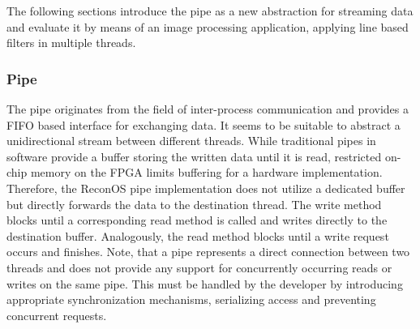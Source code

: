 The following sections introduce the pipe as a new abstraction for streaming
data and evaluate it by means of an image processing application, applying
line based filters in multiple threads.

\subsubsection{Pipe}
The pipe originates from the field of inter-process communication and provides
a \ac{FIFO} based interface for exchanging data. It seems to be suitable to
abstract a unidirectional stream between different threads. While traditional
pipes in software provide a buffer storing the written data until it is read,
restricted on-chip memory on the \ac{FPGA} limits buffering for a hardware
implementation. Therefore, the ReconOS pipe implementation does not utilize a
dedicated buffer but directly forwards the data to the destination thread. The
write method blocks until a corresponding read method is called and writes
directly to the destination buffer. Analogously, the read method blocks until
a write request occurs and finishes. Note, that a pipe represents a direct
connection between two threads and does not provide any support for
concurrently occurring reads or writes on the same pipe. This must be handled
by the developer by introducing appropriate synchronization mechanisms,
serializing access and preventing concurrent requests.

